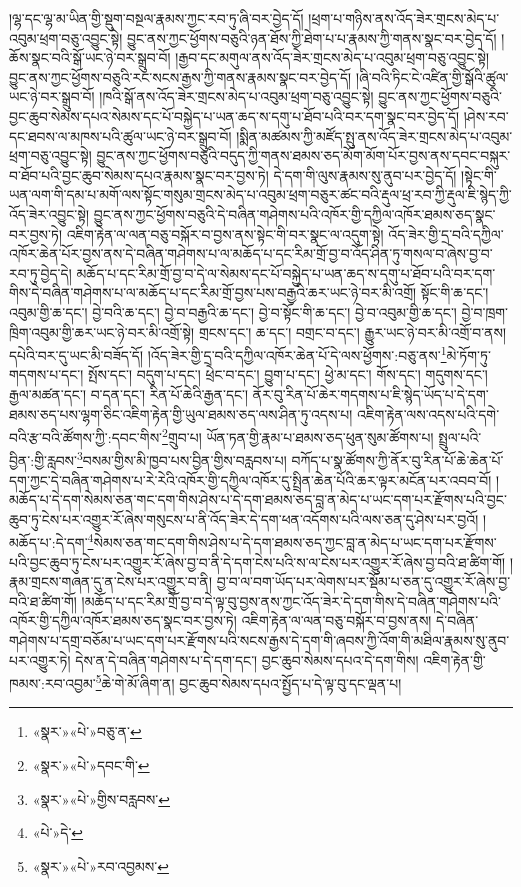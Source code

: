 །ལྷ་དང་ལྷ་མ་ཡིན་གྱི་སྡུག་བསྔལ་རྣམས་ཀྱང་རབ་ཏུ་ཞི་བར་བྱེད་དོ། །ཕྲག་པ་གཉིས་ནས་འོད་ཟེར་གྲངས་མེད་པ་འབུམ་ཕྲག་བཅུ་འབྱུང་སྟེ། བྱུང་ནས་ཀྱང་ཕྱོགས་བཅུའི་ཉན་ཐོས་ཀྱི་ཐེག་པ་པ་རྣམས་ཀྱི་གནས་སྣང་བར་བྱེད་དོ། །ཆོས་སྣང་བའི་སྒོ་ཡང་ཉེ་བར་སྒྲུབ་བོ། །རྒྱབ་དང་མགུལ་ནས་འོད་ཟེར་གྲངས་མེད་པ་འབུམ་ཕྲག་བཅུ་འབྱུང་སྟེ། བྱུང་ནས་ཀྱང་ཕྱོགས་བཅུའི་རང་སངས་རྒྱས་ཀྱི་གནས་རྣམས་སྣང་བར་བྱེད་དོ། །ཞི་བའི་ཏིང་ངེ་འཛིན་གྱི་སྒོའི་ཚུལ་ཡང་ཉེ་བར་སྒྲུབ་བོ། །ཁའི་སྒོ་ནས་འོད་ཟེར་གྲངས་མེད་པ་འབུམ་ཕྲག་བཅུ་འབྱུང་སྟེ། བྱུང་ནས་ཀྱང་ཕྱོགས་བཅུའི་བྱང་ཆུབ་སེམས་དཔའ་སེམས་དང་པོ་བསྐྱེད་པ་ཡན་ཆད་ས་དགུ་པ་ཐོབ་པའི་བར་དག་སྣང་བར་བྱེད་དོ། །ཤེས་རབ་དང་ཐབས་ལ་མཁས་པའི་ཚུལ་ཡང་ཉེ་བར་སྒྲུབ་བོ། །སྨིན་མཚམས་ཀྱི་མཛོད་སྤུ་ནས་འོད་ཟེར་གྲངས་མེད་པ་འབུམ་ཕྲག་བཅུ་འབྱུང་སྟེ། བྱུང་ནས་ཀྱང་ཕྱོགས་བཅུའི་བདུད་ཀྱི་གནས་ཐམས་ཅད་མོག་མོག་པོར་བྱས་ནས་དབང་བསྐུར་བ་ཐོབ་པའི་བྱང་ཆུབ་སེམས་དཔའ་རྣམས་སྣང་བར་བྱས་ཏེ། དེ་དག་གི་ལུས་རྣམས་སུ་ནུབ་པར་བྱེད་དོ། །སྟེང་གི་ཡན་ལག་གི་དམ་པ་མགོ་ལས་སྟོང་གསུམ་གྲངས་མེད་པ་འབུམ་ཕྲག་བཅུར་ཚང་བའི་རྡུལ་ཕྲ་རབ་ཀྱི་རྡུལ་ཇི་སྙེད་ཀྱི་འོད་ཟེར་འབྱུང་སྟེ། བྱུང་ནས་ཀྱང་ཕྱོགས་བཅུའི་དེ་བཞིན་གཤེགས་པའི་འཁོར་གྱི་དཀྱིལ་འཁོར་ཐམས་ཅད་སྣང་བར་བྱས་ཏེ། འཇིག་རྟེན་ལ་ལན་བཅུ་བསྐོར་བ་བྱས་ནས་སྟེང་གི་བར་སྣང་ལ་འདུག་སྟེ། འོད་ཟེར་གྱི་དྲ་བའི་དཀྱིལ་འཁོར་ཆེན་པོར་བྱས་ནས་དེ་བཞིན་གཤེགས་པ་ལ་མཆོད་པ་དང་རིམ་གྲོ་བྱ་བ་འོད་ཤིན་ཏུ་གསལ་བ་ཞེས་བྱ་བ་རབ་ཏུ་བྱེད་དེ། མཆོད་པ་དང་རིམ་གྲོ་བྱ་བ་དེ་ལ་སེམས་དང་པོ་བསྐྱེད་པ་ཡན་ཆད་ས་དགུ་པ་ཐོབ་པའི་བར་དག་གིས་དེ་བཞིན་གཤེགས་པ་ལ་མཆོད་པ་དང་རིམ་གྲོ་བྱས་པས་བརྒྱའི་ཆར་ཡང་ཉེ་བར་མི་འགྲོ། སྟོང་གི་ཆ་དང་། འབུམ་གྱི་ཆ་དང་། བྱེ་བའི་ཆ་དང་། བྱེ་བ་བརྒྱའི་ཆ་དང་། བྱེ་བ་སྟོང་གི་ཆ་དང་། བྱེ་བ་འབུམ་གྱི་ཆ་དང་། བྱེ་བ་ཁྲག་ཁྲིག་འབུམ་གྱི་ཆར་ཡང་ཉེ་བར་མི་འགྲོ་སྟེ། གྲངས་དང་། ཆ་དང་། བགྲང་བ་དང་། རྒྱུར་ཡང་ཉེ་བར་མི་འགྲོ་བ་ནས། དཔེའི་བར་དུ་ཡང་མི་བཟོད་དོ། །འོད་ཟེར་གྱི་དྲ་བའི་དཀྱིལ་འཁོར་ཆེན་པོ་དེ་ལས་ཕྱོགས་:བཅུ་ནས་\footnote{«སྣར་»«པེ་»བཅུ་ན་}མེ་ཏོག་ཏུ་གདགས་པ་དང་། སྤོས་དང་། བདུག་པ་དང་། ཕྲེང་བ་དང་། བྱུག་པ་དང་། ཕྱེ་མ་དང་། གོས་དང་། གདུགས་དང་། རྒྱལ་མཚན་དང་། བ་དན་དང་། རིན་པོ་ཆེའི་རྒྱན་དང་། ནོར་བུ་རིན་པོ་ཆེར་གདགས་པ་ཇི་སྙེད་ཡོད་པ་དེ་དག་ཐམས་ཅད་པས་ལྷག་ཅིང་འཇིག་རྟེན་གྱི་ཡུལ་ཐམས་ཅད་ལས་ཤིན་ཏུ་འདས་པ། འཇིག་རྟེན་ལས་འདས་པའི་དགེ་བའི་རྩ་བའི་ཚོགས་ཀྱི་:དབང་གིས་\footnote{«སྣར་»«པེ་»དབང་གི་}གྲུབ་པ། ཡོན་ཏན་གྱི་རྣམ་པ་ཐམས་ཅད་ཕུན་སུམ་ཚོགས་པ། སྤྲུལ་པའི་བྱིན་:གྱི་རླབས་\footnote{«སྣར་»«པེ་»གྱིས་བརླབས་}བསམ་གྱིས་མི་ཁྱབ་པས་བྱིན་གྱིས་བརླབས་པ། བཀོད་པ་སྣ་ཚོགས་ཀྱི་ནོར་བུ་རིན་པོ་ཆེ་ཆེན་པོ་དག་ཀྱང་དེ་བཞིན་གཤེགས་པ་རེ་རེའི་འཁོར་གྱི་དཀྱིལ་འཁོར་དུ་སྤྲིན་ཆེན་པོའི་ཆར་ལྟར་མངོན་པར་འབབ་བོ། །མཆོད་པ་དེ་དག་སེམས་ཅན་གང་དག་གིས་ཤེས་པ་དེ་དག་ཐམས་ཅད་བླ་ན་མེད་པ་ཡང་དག་པར་རྫོགས་པའི་བྱང་ཆུབ་ཏུ་ངེས་པར་འགྱུར་རོ་ཞེས་གསུངས་པ་ནི་འོད་ཟེར་དེ་དག་ཕན་འདོགས་པའི་ལས་ཅན་དུ་ཤེས་པར་བྱའོ། །མཆོད་པ་:དེ་དག་\footnote{«པེ་»དེ་}སེམས་ཅན་གང་དག་གིས་ཤེས་པ་དེ་དག་ཐམས་ཅད་ཀྱང་བླ་ན་མེད་པ་ཡང་དག་པར་རྫོགས་པའི་བྱང་ཆུབ་ཏུ་ངེས་པར་འགྱུར་རོ་ཞེས་བྱ་བ་ནི་དེ་དག་ངེས་པའི་ས་ལ་ངེས་པར་འགྱུར་རོ་ཞེས་བྱ་བའི་ཐ་ཚིག་གོ། །རྣམ་གྲངས་གཞན་དུ་ན་ངེས་པར་འགྱུར་བ་ནི། བྱ་བ་ལ་བག་ཡོད་པར་ལེགས་པར་སྡོམ་པ་ཅན་དུ་འགྱུར་རོ་ཞེས་བྱ་བའི་ཐ་ཚིག་གོ། །མཆོད་པ་དང་རིམ་གྲོ་བྱ་བ་དེ་ལྟ་བུ་བྱས་ནས་ཀྱང་འོད་ཟེར་དེ་དག་གིས་དེ་བཞིན་གཤེགས་པའི་འཁོར་གྱི་དཀྱིལ་འཁོར་ཐམས་ཅད་སྣང་བར་བྱས་ཏེ། འཇིག་རྟེན་ལ་ལན་བཅུ་བསྐོར་བ་བྱས་ནས། དེ་བཞིན་གཤེགས་པ་དགྲ་བཅོམ་པ་ཡང་དག་པར་རྫོགས་པའི་སངས་རྒྱས་དེ་དག་གི་ཞབས་ཀྱི་འོག་གི་མཐིལ་རྣམས་སུ་ནུབ་པར་འགྱུར་ཏེ། དེས་ན་དེ་བཞིན་གཤེགས་པ་དེ་དག་དང་། བྱང་ཆུབ་སེམས་དཔའ་དེ་དག་གིས། འཇིག་རྟེན་གྱི་ཁམས་:རབ་འབྱམ་\footnote{«སྣར་»«པེ་»རབ་འབྱམས་}ཆེ་གེ་མོ་ཞིག་ན། བྱང་ཆུབ་སེམས་དཔའ་སྤྱོད་པ་དེ་ལྟ་བུ་དང་ལྡན་པ། 